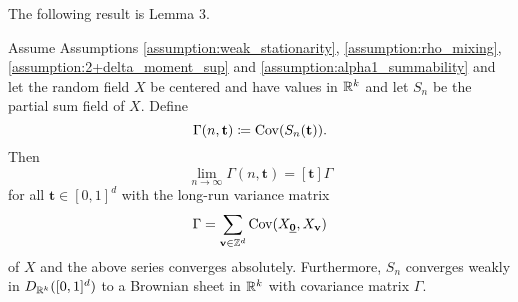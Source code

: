The following result is \cite{[0]BUCCHIA2017344} Lemma 3.
\begin{lemma} \label{lemma:3}
    Assume Assumptions \ref{assumption:weak_stationarity}, \ref{assumption:rho_mixing}, \ref{assumption:2+delta_moment_sup} and \ref{assumption:alpha1_summability} and let the random field $X$ be centered and have values in $\mathbb{R}^k$ and let $S_n$ be the partial sum field of $X$. Define \[ \Gamma(n, \mathbf{t}) \coloneqq \mathrm{Cov}(S_n(\mathbf{t})). \]
    Then 
    \[ \lim\limits_{n \to \infty} \Gamma(n, \mathbf{t}) = [\mathbf{t}] \Gamma \]
    for all $\mathbf{t} \in [0, 1]^d$ with the long-run variance matrix 
    \[ \Gamma = \sum\limits_{\mathbf{v} \in \ZZ^d} \Cov(X_{\usbf[0]}, X_\mathbf{v}) \]
    of $X$ and the above series converges absolutely. Furthermore, $S_n$ converges weakly in $D_{\mathbb{R}^k}([0, 1]^d)$ to a Brownian sheet in $\mathbb{R}^k$ with covariance matrix $\Gamma$.
\end{lemma}
